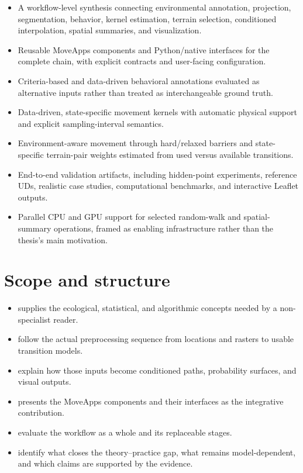 \begin{itemize}
  \item A workflow-level synthesis connecting environmental annotation, projection, segmentation, behavior, kernel estimation, terrain selection, conditioned interpolation, spatial summaries, and visualization.
  \item Reusable MoveApps components and Python/native interfaces for the complete chain, with explicit contracts and user-facing configuration.
  \item Criteria-based and data-driven behavioral annotations evaluated as alternative inputs rather than treated as interchangeable ground truth.
  \item Data-driven, state-specific movement kernels with automatic physical support and explicit sampling-interval semantics.
  \item Environment-aware movement through hard/relaxed barriers and state-specific terrain-pair weights estimated from used versus available transitions.
  \item End-to-end validation artifacts, including hidden-point experiments, reference UDs, realistic case studies, computational benchmarks, and interactive Leaflet outputs.
  \item Parallel CPU and GPU support for selected random-walk and spatial-summary operations, framed as enabling infrastructure rather than the thesis's main motivation.
\end{itemize}

\section{Scope and structure}

\begin{itemize}
  \item {} supplies the ecological, statistical, and algorithmic concepts needed by a non-specialist reader.
  \item {} follow the actual preprocessing sequence from locations and rasters to usable transition models.
  \item {} explain how those inputs become conditioned paths, probability surfaces, and visual outputs.
  \item {} presents the MoveApps components and their interfaces as the integrative contribution.
  \item {} evaluate the workflow as a whole and its replaceable stages.
  \item {} identify what closes the theory--practice gap, what remains model-dependent, and which claims are supported by the evidence.
\end{itemize}
